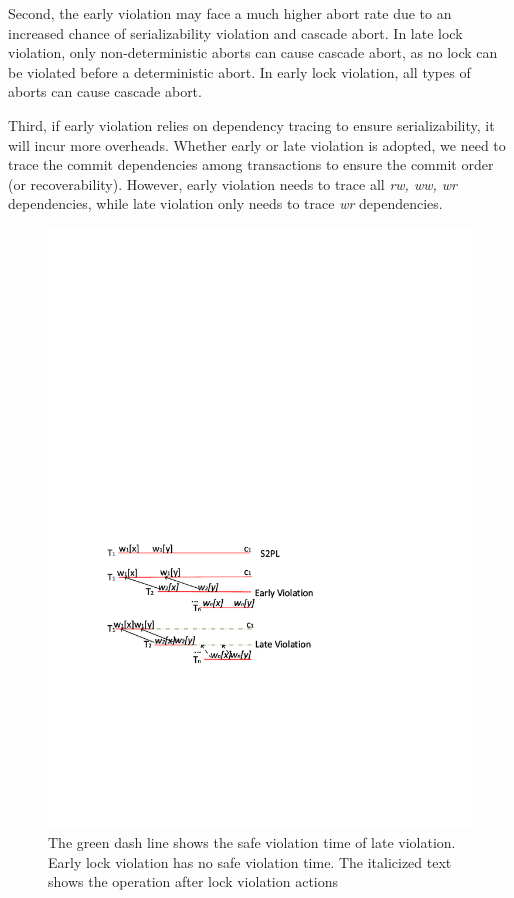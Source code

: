 \documentclass[conference]{IEEEtran}
\begin{document}
Second, the early violation may face a much higher abort rate due to an increased chance of serializability violation and cascade abort.
In late lock violation, only non-deterministic aborts can cause cascade abort, as no lock can be violated before a deterministic abort.
In early lock violation, all types of aborts can cause cascade abort.

Third, if early violation relies on dependency tracing to ensure serializability, it will incur more overheads.
Whether early or late violation is adopted, we need to trace the commit dependencies among transactions to ensure the commit order (or recoverability).
However, early violation needs to trace all \emph{rw, ww, wr} dependencies, while late violation only needs to trace \emph{wr} dependencies.


\begin{figure}[tbp]
  \centerline{\includegraphics[scale=0.6]{figure/lock_violation_safe.pdf}}
  \caption
  {The green dash line shows the safe violation time of late violation.
  Early lock violation has no safe violation time.
  The italicized text shows the operation after lock violation actions}
\label{fig:lock_violation_safe}
\end{figure}
\end{document}
